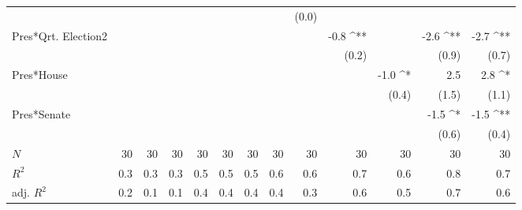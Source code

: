 \documentclass[a4paper]{article}\usepackage{graphicx, color}
\begin{document}
\begin{table}[ht]
\begin{center}
{\begin{tabular}{ l D{.}{.}{1}D{.}{.}{1}D{.}{.}{1}D{.}{.}{1}D{.}{.}{1}D{.}{.}{1}D{.}{.}{1}D{.}{.}{1}D{.}{.}{1}D{.}{.}{1}D{.}{.}{1}D{.}{.}{1} }
                     &                 &                 &                 &                 &                 &                 &                 & (0.0)           &                 &                 &                 &                \\ 
Pres*Qrt. Election2  &                 &                 &                 &                 &                 &                 &                 &                 & -0.8 ^{**}      &                 & -2.6 ^{**}      & -2.7 ^{**}     \\ 
                     &                 &                 &                 &                 &                 &                 &                 &                 & (0.2)           &                 & (0.9)           & (0.7)          \\ 
Pres*House           &                 &                 &                 &                 &                 &                 &                 &                 &                 & -1.0 ^*         & 2.5             & 2.8 ^*         \\ 
                     &                 &                 &                 &                 &                 &                 &                 &                 &                 & (0.4)           & (1.5)           & (1.1)          \\ 
Pres*Senate          &                 &                 &                 &                 &                 &                 &                 &                 &                 &                 & -1.5 ^*         & -1.5 ^{**}     \\ 
                     &                 &                 &                 &                 &                 &                 &                 &                 &                 &                 & (0.6)           & (0.4)           \\
 $N$                  & 30              & 30              & 30              & 30              & 30              & 30              & 30              & 30              & 30              & 30              & 30              & 30             \\ 
$R^2$                & 0.3             & 0.3             & 0.3             & 0.5             & 0.5             & 0.5             & 0.6             & 0.6             & 0.7             & 0.6             & 0.8             & 0.7            \\ 
adj. $R^2$           & 0.2             & 0.1             & 0.1             & 0.4             & 0.4             & 0.4             & 0.4             & 0.3             & 0.6             & 0.5             & 0.7             & 0.6            \\ 

\end{tabular}}
\end{center}
\end{table}
\end{document}
